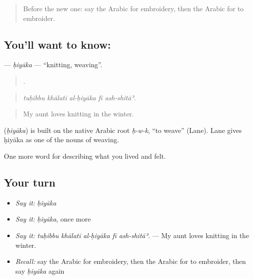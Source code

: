 \label{lesson:AR-C538-hiyaka}



\begin{quote}
Before the new one: say the Arabic for embroidery, then the Arabic for to embroider.
\end{quote}

\subsection*{You'll want to know: }
\textbf{} — \emph{ḥiyāka} — \textquotedblleft{}knitting, weaving\textquotedblright{}.

\begin{quote}
    .
\end{quote}

\begin{quote}
\emph{tuḥibbu khālatī al-ḥiyāka fī ash-shitāʾ.}
\end{quote}

\begin{quote}
My aunt loves knitting in the winter.
\end{quote}

\begin{cousinweb}
\textbf{} (\emph{ḥiyāka}) is built on the native Arabic root \emph{ḥ-w-k}, \textquotedblleft{}to weave\textquotedblright{} (Lane). Lane gives ḥiyāka as one of the nouns of weaving.
\end{cousinweb}

\begin{grammarlens}[title={What you've built}]
One more word for describing what you lived and felt.
\end{grammarlens}

\subsection*{Your turn}
\begin{itemize}
\raggedright
  \item \emph{Say it:} \emph{ḥiyāka}
  \item \emph{Say it:} \emph{ḥiyāka}, once more
  \item \emph{Say it:} \emph{tuḥibbu khālatī al-ḥiyāka fī ash-shitāʾ.} — My aunt loves knitting in the winter.
  \item \emph{Recall:} say the Arabic for embroidery, then the Arabic for to embroider, then say \emph{ḥiyāka} again
\end{itemize}

